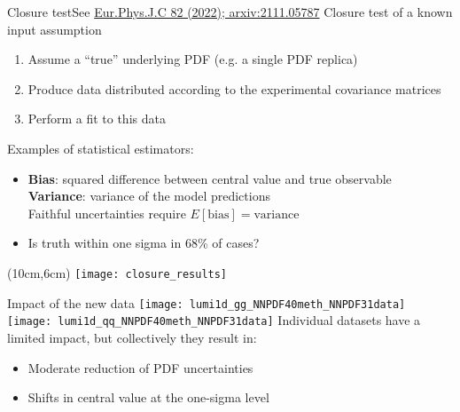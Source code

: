 \begin{frame}[t]{Closure test}{See \href{https://arxiv.org/pdf/2103.08606.pdf}{\color{blue}Eur.Phys.J.C 82 (2022); arxiv:2111.05787}}
    Closure test of a known input assumption
    \begin{enumerate}
        \item Assume a ``true'' underlying PDF (e.g. a single PDF replica)
        \item Produce data distributed according to the experimental covariance matrices
        \item Perform a fit to this data
    \end{enumerate}
    \vspace*{1em}
    Examples of statistical estimators:

    \begin{itemize}
        \item \textbf{Bias}: squared difference between central value and true observable\\
        \textbf{Variance}: variance of the model predictions\\
        Faithful uncertainties require $E[\textrm{bias}]=\textrm{variance}$
        \item Is truth within one sigma in 68\% of cases?
    \end{itemize}
    \vspace*{1em}
    \begin{textblock*}{\textwidth}(10cm,6cm) %
        \texttt{[image: closure\_results]}
    \end{textblock*}
\end{frame}




\begin{frame}[t]{Impact of the new data}
	\texttt{[image: lumi1d\_gg\_NNPDF40meth\_NNPDF31data]}
	\texttt{[image: lumi1d\_qq\_NNPDF40meth\_NNPDF31data]}
	Individual datasets have a limited impact, but collectively they result in:
	\begin{itemize}
	    \item Moderate reduction of PDF uncertainties
	    \item Shifts in central value at the one-sigma level
	\end{itemize}
\end{frame}


